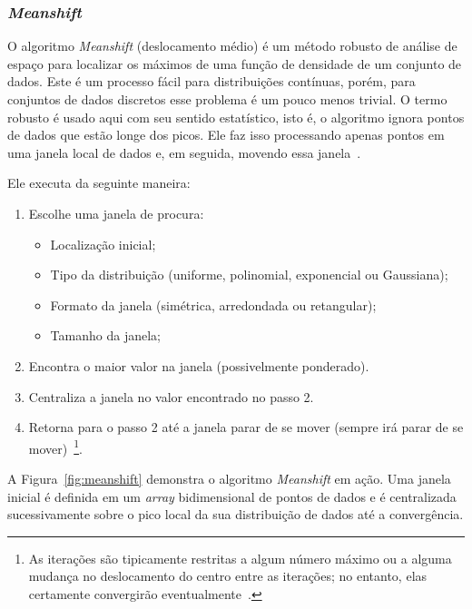 \subsubsection{\textit{Meanshift}}
\label{subsubsec:meanshift}

O algoritmo \textit{Meanshift} (deslocamento médio) é um método robusto de análise de espaço para localizar os máximos de uma função de densidade de um conjunto de dados. Este é um processo fácil para distribuições contínuas, porém, para conjuntos de dados discretos esse problema é um pouco menos trivial. O termo robusto é usado aqui com seu sentido estatístico, isto é, o algoritmo ignora pontos de dados que estão longe dos picos. Ele faz isso processando apenas pontos em uma janela local de dados e, em seguida, movendo essa janela~\cite{bradski2008learning}.

Ele executa da seguinte maneira:
\begin{enumerate}
    \item Escolhe uma janela de procura:
    \begin{itemize}
        \item Localização inicial;
        \item Tipo da distribuição (uniforme, polinomial, exponencial ou Gaussiana);
        \item Formato da janela (simétrica, arredondada ou retangular);
        \item Tamanho da janela;
    \end{itemize}
    \item Encontra o maior valor na janela (possivelmente ponderado).
    \item Centraliza a janela no valor encontrado no passo 2.
    \item Retorna para o passo 2 até a janela parar de se mover (sempre irá parar de se mover)~\footnote{As iterações são tipicamente restritas a algum número máximo ou a alguma mudança no deslocamento do centro entre as iterações; no entanto, elas certamente convergirão eventualmente~\cite{bradski2008learning}.}.
\end{enumerate}

A Figura~\ref{fig:meanshift} demonstra o algoritmo \textit{Meanshift} em ação. Uma janela inicial é definida em um \textit{array} bidimensional de pontos de dados e é centralizada sucessivamente sobre o pico local da sua distribuição de dados até a convergência.

